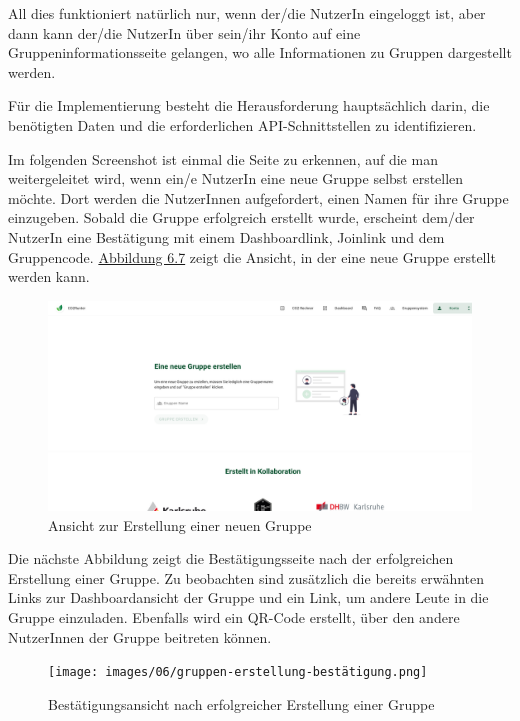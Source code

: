 All dies funktioniert natürlich nur, wenn der/die NutzerIn eingeloggt ist, aber dann kann der/die NutzerIn über sein/ihr Konto auf eine Gruppeninformationsseite gelangen, wo alle Informationen zu Gruppen dargestellt werden.

Für die Implementierung besteht die Herausforderung hauptsächlich darin, die benötigten Daten und die erforderlichen \acs{API}-Schnittstellen zu identifizieren.

Im folgenden Screenshot ist einmal die Seite zu erkennen, auf die man weitergeleitet wird, wenn ein/e NutzerIn eine neue Gruppe selbst erstellen möchte. Dort werden die NutzerInnen aufgefordert, einen Namen für ihre Gruppe einzugeben. Sobald die Gruppe erfolgreich erstellt wurde, erscheint dem/der NutzerIn eine Bestätigung mit einem Dashboardlink, Joinlink und dem Gruppencode. \hyperref[fig:neue-gruppe-design]{Abbildung 6.7} zeigt die Ansicht, in der eine neue Gruppe erstellt werden kann.

\begin{figure}[H]
    \centering
    \includegraphics[width=1\textwidth]{images/06/gruppe-erstellen-design.png}
    \caption{Ansicht zur Erstellung einer neuen Gruppe}
    \label{fig:neue-gruppe-design}
\end{figure}

Die nächste Abbildung zeigt die Bestätigungsseite nach der erfolgreichen Erstellung einer Gruppe. Zu beobachten sind zusätzlich die bereits erwähnten Links zur Dashboardansicht der Gruppe und ein Link, um andere Leute in die Gruppe einzuladen. Ebenfalls wird ein QR-Code erstellt, über den andere NutzerInnen der Gruppe beitreten können.

\begin{figure}[H]
    \centering
    \texttt{[image: images/06/gruppen-erstellung-bestätigung.png]}
    \caption{Bestätigungsansicht nach erfolgreicher Erstellung einer Gruppe}
    \label{fig:gruppe-erfolgreich-erstellt}
\end{figure}

